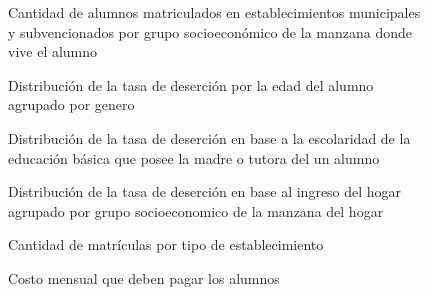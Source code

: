\begin{figure}[H]
  \centering
      \caption{Cantidad de alumnos matriculados en establecimientos municipales y subvencionados por grupo socioeconómico de la manzana donde vive el alumno}
    \label{fig:came3}
\end{figure}

\begin{figure}[H]
  \centering
      \caption{Distribución de la tasa de deserción por la edad del alumno agrupado por genero}
    \label{fig:came}
\end{figure}

\begin{figure}[H]
  \centering
      \caption{Distribución de la tasa de deserción en base a la escolaridad de la educación básica que posee la madre o tutora del un alumno}
    \label{fig:tdm}
\end{figure}

\begin{figure}[H]
  \centering
      \caption{Distribución de la tasa de deserción en base al ingreso del hogar agrupado por grupo socioeconomico de la manzana del hogar}
    \label{fig:tdih}
\end{figure}

\begin{figure}[H]
  \centering
      \caption{Cantidad de matrículas por tipo de establecimiento}
    \label{fig:cme}
\end{figure}

\begin{figure}[H]
  \centering
      \caption{Costo mensual que deben pagar los alumnos}
    \label{fig:cma}
\end{figure}